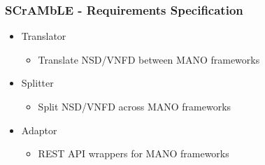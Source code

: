 \begin{frame}
\frametitle{SCrAMbLE - Requirements Specification}
\begin{itemize}
	
	\item Translator
	\begin{itemize}
		\item Translate NSD/VNFD between MANO frameworks \\
	\end{itemize}

	\item Splitter
	\begin{itemize}
		\item Split NSD/VNFD across MANO frameworks \\
	\end{itemize}
	
	\item Adaptor
	\begin{itemize}
		\item REST API wrappers for MANO frameworks \\
	\end{itemize}
\end{itemize}
\end{frame}
